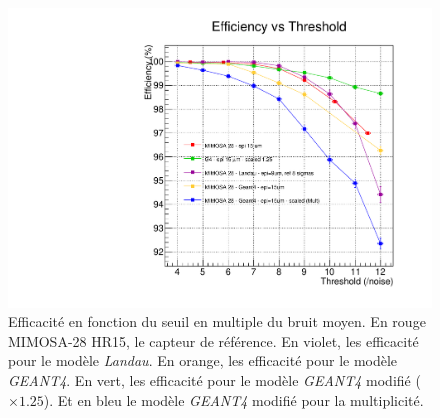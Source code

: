    \begin{figure}[!htb]
    \begin{center} 
     \includegraphics[scale=0.52]{./figures/Plots_resultat_simu/G4_landau_eff_oct.pdf}
     \caption{Efficacit\'e en fonction du seuil en multiple du bruit moyen. En rouge MIMOSA-28 HR15, le capteur de r\'ef\'erence. En violet, les efficacit\'e pour le mod\`ele \textit{Landau}. En orange, les efficacit\'e pour le mod\`ele \textit{GEANT4}. En vert, les efficacit\'e pour le mod\`ele \textit{GEANT4} modifi\'e ($\times 1.25$). Et en bleu le mod\`ele \textit{GEANT4} modifi\'e pour la multiplicit\'e.}
    \label{fig:efficiency}
    \end{center}
   \end{figure} 
   
   \medskip
   
